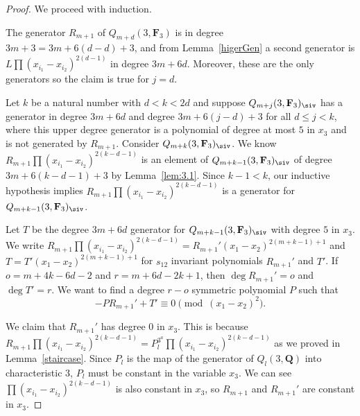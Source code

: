 \begin{proof} We proceed with induction.

 The generator $R_{m+1}$ of $Q_{m+d}(3,\mathbf{F}_3)$ is in degree $3m+3=3m+6(d-d)+3$, and from Lemma~\ref{higerGen} a second generator is $L\prod(x_{i_1}-x_{i_2})^{2(d-1)}$ in degree $3m+6d$. Moreover, these are the only generators so the claim is true for $j=d$.

 Let $k$ be a natural number with $d<k<2d$ and suppose $Q_{m+j}(3,\mathbf{F}_3)_{\siv}$ has a generator in degree $3m+6d$ and degree $3m+6(j-d)+3$ for all $d\leq j < k$, where this upper degree generator is a polynomial of degree at most $5$ in $x_3$ and is not generated by $R_{m+1}$. Consider $Q_{m+k}(3,\mathbf{F}_3)_{\siv}$. We know $R_{m+1}\prod(x_{i_1}-x_{i_2})^{2(k-d-1)}$ is an element of $Q_{m+k-1}(3,\mathbf{F}_3)_{\siv}$ of degree $3m+6(k-d-1)+3$ by Lemma~\ref{lem:3.1}. Since $k-1<k$, our inductive hypothesis implies $R_{m+1}\prod(x_{i_1}-x_{i_2})^{2(k-d-1)}$ is a generator for $Q_{m+k-1}(3,\mathbf{F}_3)_{\siv}$.

 Let $T$ be the degree $3m+6d$ generator for $Q_{m+k-1}(3,\mathbf{F}_3)_{\siv}$ with degree $5$ in $x_3$. We write $R_{m+1}\prod(x_{i_1}-x_{i_2})^{2(k-d-1)} = R_{m+1}'(x_1-x_2)^{2(m+k-1)+1}$ and $T=T'(x_1-x_2)^{2(m+k-1)+1}$ for $s_{12}$ invariant polynomials $R_{m+1}'$ and $T'$. If $o = m+4k-6d-2$ and $r = m+6d-2k+1$, then $\deg R_{m+1}' =o$ and $\deg T' = r$. We want to find a degree $r-o$ symmetric polynomial $P$ such that
 \[-PR_{m+1}'+T'\equiv 0 \pmod{(x_1-x_2)^2}.\]

 We claim that $R_{m+1}'$ has degree $0$ in $x_3$. This is because $R_{m+1}\prod (x_{i_1}-x_{i_2})^{2(k-d-1)}=P_l^{3^a}\prod (x_{i_1}-x_{i_2})^{2(k-d-1)}$ as we proved in Lemma~\ref{staircase}. Since $P_l$ is the map of the generator of $Q_l(3,\mathbf{Q})$ into characteristic $3$, $P_l$ must be constant in the variable $x_3$. We can see ${\prod (x_{i_1}-x_{i_2})^{2(k-d-1)}}$ is also constant in $x_3$, so $R_{m+1}$ and $R_{m+1}'$ are constant in $x_3$.


\end{proof}
